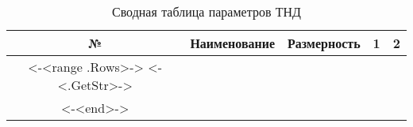 \begin{center}
    \begin{longtable}{|c|c|c|c|c|}
        \hline
        \textbf{№} &
        \textbf{Наименование} &
        \textbf{Размерность} &
        \textbf{1} &
        \textbf{2} \\\hline
        \endhead
        <-<range .Rows>->
        <-<.GetStr>-> \\\hline
        <-<end>->
        \caption{Сводная таблица параметров ТНД} \label{tab:lpt-stage-total}
    \end{longtable}
\end{center}